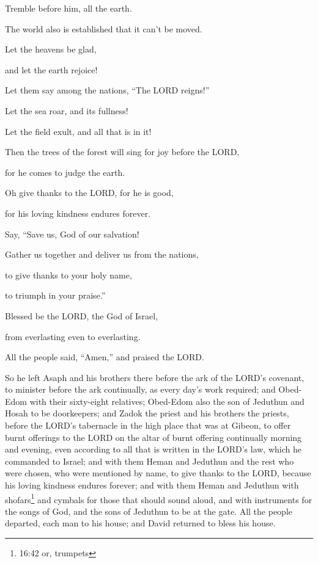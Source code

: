 \myverse{}Tremble before him, all the earth.

The world also is established that it can’t be moved.

\myverse{}Let the heavens be glad,

and let the earth rejoice!

Let them say among the nations, “The LORD reigns!”

\myverse{}Let the sea roar, and its fullness!

Let the field exult, and all that is in it!

\myverse{}Then the trees of the forest will sing for joy before the LORD,

for he comes to judge the earth.

\myverse{}Oh give thanks to the LORD, for he is good,

for his loving kindness endures forever.

\myverse{}Say, “Save us, God of our salvation!

Gather us together and deliver us from the nations,

to give thanks to your holy name,

to triumph in your praise.”

\myverse{}Blessed be the LORD, the God of Israel,

from everlasting even to everlasting.

All the people said, “Amen,” and praised the LORD.

\myverse{}So he left Asaph and his brothers there before the ark of the
LORD’s covenant, to minister before the ark continually, as every day’s work required;
\myverse{}and Obed-Edom with their sixty-eight relatives; Obed-Edom also the son of
Jeduthun and Hosah to be doorkeepers;
\myverse{}and Zadok the priest and his brothers the priests, before the LORD’s tabernacle
in the high place that was at Gibeon,
\myverse{}to offer burnt offerings to the LORD on the altar of burnt offering continually
morning and evening, even according to all that is written in the LORD’s law, which he commanded to Israel;
\myverse{}and with them Heman and Jeduthun and the rest who were chosen, who were mentioned
by name, to give thanks to the LORD, because his loving kindness endures forever;
\myverse{}and with them Heman and Jeduthun with shofars\footnote{16:42 or, trumpets}
and cymbals for those that should sound aloud, and with instruments for the songs of God, and the sons
of Jeduthun to be at the gate.
\myverse{}All the people departed, each man to his house; and David returned to bless
his house.


